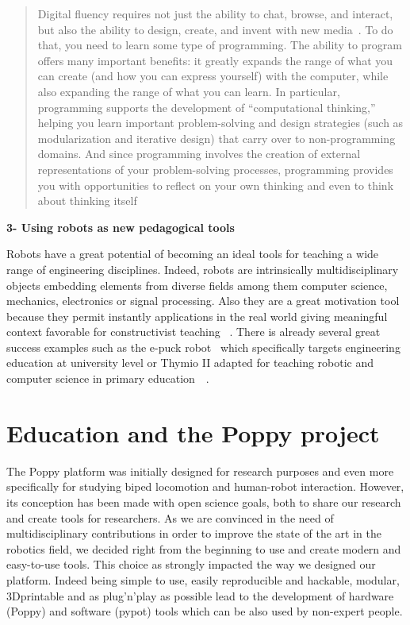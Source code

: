 \begin{quotation}
    Digital fluency requires not just the ability to chat, browse, and interact, but also the ability to design, create, and invent with new media~\cite{resnick2008sowing}. To do that, you need to learn some type of programming. The ability to program offers many important benefits: it greatly expands the range of what you can create (and how you can express yourself) with the computer, while also expanding the range of what you can learn. In particular, programming supports the development of “computational thinking,” helping you learn important problem-solving and design strategies (such as modularization and iterative design) that carry over to non-programming domains. And since programming involves the creation of external representations of your problem-solving processes, programming provides you with opportunities to reflect on your own thinking and even to think about thinking itself~\cite{disessa2001changing}


\end{quotation}


\textbf{3- Using robots as new pedagogical tools}

Robots have a great potential of becoming an ideal tools for teaching a wide range of engineering disciplines. Indeed, robots are intrinsically multidisciplinary objects embedding elements from diverse fields among them computer science, mechanics, electronics or signal processing. Also they are a great motivation tool because they permit instantly applications in the real world giving meaningful context favorable for constructivist teaching~\cite{palincsar1998social} \cite{papert1991situating}. There is already several great success examples such as the e-puck robot~\cite{mondada2009puck} which specifically targets engineering education at university level or Thymio II adapted for teaching robotic and computer science in primary education~\cite{riedo2012two}~\cite{riedo2013thymio}.


\section{Education and the Poppy project} %

The Poppy platform was initially designed for research purposes and even more specifically for studying biped locomotion and human-robot interaction. However, its conception has been made with open science goals, both to share our research and create tools for researchers. As we are convinced in the need of multidisciplinary contributions in order to improve the state of the art in the robotics field, we decided right from the beginning to use and create modern and easy-to-use tools. This choice as strongly impacted the way we designed our platform. Indeed being simple to use, easily reproducible and hackable, modular, 3Dprintable and as plug'n'play as possible lead to the development of hardware (Poppy) and software (pypot) tools which can be also used by non-expert people.

